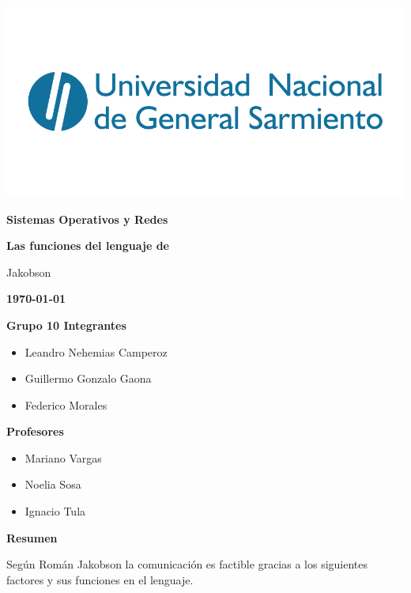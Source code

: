 \documentclass[a4paper,12pt,titlepage]{article} %
\newcommand{\titulo}{Las funciones del lenguaje de\par Jakobson}
\newcommand{\Autor}{Grupo 10 Integrantes}
\begin{document}
\begin{titlepage}
  \begin{center}
   \includegraphics[width=1.0\textwidth]{./Imagenes/logo_ungs.png}\par\vspace{0.1cm}
                  {\LARGE \bfseries Sistemas Operativos y Redes}\par\vspace{0.5cm}
                  {\huge \bfseries\textcolor{colorUngs}\titulo}\par\vspace{0.2cm}
                  {\large \bfseries \today}  
  \end{center}

\vspace{2.5cm}

  \bfseries{{\large \Autor}}
  \small\begin{itemize}
    \item Leandro Nehemias Camperoz
    \item Guillermo Gonzalo Gaona
    \item Federico Morales
  \end{itemize}
  
  \vspace{1.5cm}

  \bfseries{\large Profesores}
  \small\begin{itemize}
    \item Mariano Vargas
    \item Noelia Sosa
    \item Ignacio Tula
  \end{itemize}
\end{titlepage}

{\Large \textbf{Resumen}}\newline

Según Román Jakobson la comunicación es factible gracias a los siguientes factores y sus funciones 
en el lenguaje.\newline
\end{document}
